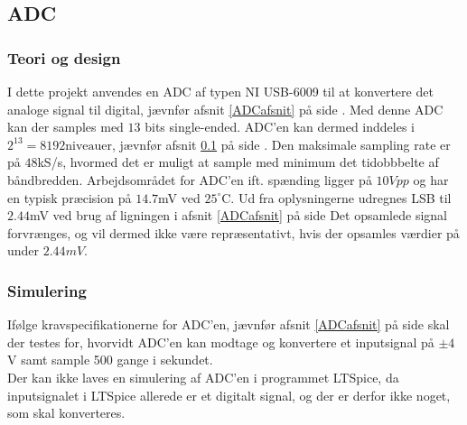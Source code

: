 \subsection{ADC}\label{ADC_afsnit}
\subsubsection{Teori og design}
I dette projekt anvendes en ADC af typen NI USB-6009 til at konvertere det analoge signal til digital, jævnfør afsnit \ref{ADCafsnit} på side \pageref{ADCafsnit}. %
Med denne ADC kan der samples med $13$ bits single-ended. ADC'en kan dermed inddeles i $2^{13} = 8192 \text{niveauer}$, jævnfør afsnit \ref{ADC_afsnit} på side \pageref{ADC_afsnit}. Den maksimale sampling rate er på $48$kS/s, hvormed det er muligt at sample med minimum det tidobbbelte af båndbredden. Arbejdsområdet for ADC'en ift. spænding ligger på $10Vpp$ og har en typisk præcision på $14.7$mV ved $25^{\circ}$C. \cite{Instruments2014} Ud fra oplysningerne udregnes LSB til $2.44$mV ved brug af ligningen i afsnit \ref{ADCafsnit} på side \pageref{ADCafsnit} %
Det opsamlede signal forvrænges, og vil dermed ikke være repræsentativt, hvis der opsamles værdier på under $2.44mV$.\\
\subsubsection{Simulering}
Ifølge kravspecifikationerne for ADC'en, jævnfør afsnit \ref{ADCafsnit} på side \pageref{ADCafsnit} skal der testes for, hvorvidt ADC'en kan modtage og konvertere et inputsignal på $\pm4$V samt sample 500 gange i sekundet. \\
Der kan ikke laves en simulering af ADC'en i programmet LTSpice, da inputsignalet i LTSpice allerede er et digitalt signal, og der er derfor ikke noget, som skal konverteres.
 
